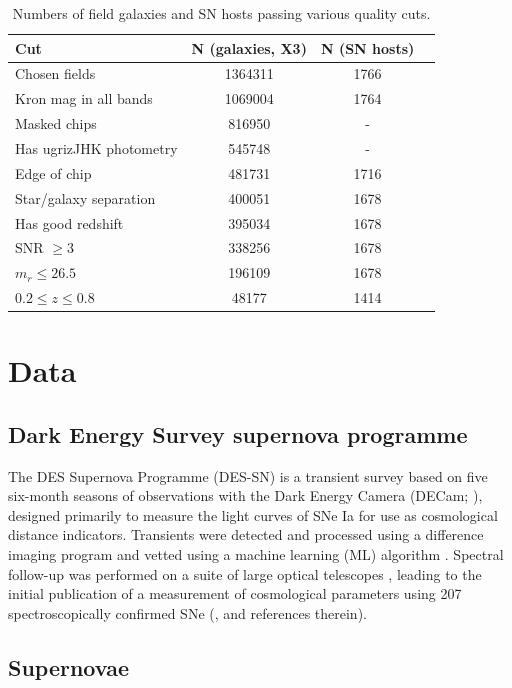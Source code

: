 \documentclass[fleqn,usenatbib]{mnras}
\begin{document}
\begin{table}
	\centering
	\caption{Numbers of field galaxies and SN hosts passing various quality cuts.}
	\label{tab:field_vuts}
	\begin{tabular}{lccr} %
		\hline
		Cut & N (galaxies, X3)  & N (SN hosts)\\
		\hline
		Chosen fields & 1364311  & 1766\\
	    Kron mag in all bands & 1069004  & 1764 \\
	    Masked chips & 816950  & - \\
	    Has ugrizJHK photometry & 545748  & -\\
	    Edge of chip & 481731 & 1716 \\
	    Star/galaxy separation & 400051 &  1678\\
	    Has good redshift & 395034 & 1678 \\
	    SNR $\geq 3$& 338256  & 1678 \\
	    $m_r \leq 26.5$ & 196109 &  1678 \\
	    $0.2 \leq z \leq 0.8$ & 48177 & 1414\\ 
	    
		\hline
	\end{tabular}
\end{table}

\section{Data \label{sec:data}}
\subsection{Dark Energy Survey supernova programme \label{subsec:des}}
The DES Supernova Programme (DES-SN) is a transient survey based on five six-month seasons of observations with the Dark Energy Camera (DECam; \citealt{Flaugher2015}), designed primarily to measure the light curves of SNe Ia for use as cosmological distance indicators. Transients were detected and processed using a difference imaging program \citep{Kessler2015} and vetted using a machine learning (ML) algorithm \citep{Goldstein2015}. Spectral follow-up was performed on a suite of large optical telescopes \citet{Smith2020b}, leading to the initial publication of a measurement of cosmological parameters using 207 spectroscopically confirmed SNe (\citealt{DESCollaboration2018a}, and references therein). 
\subsection{Supernovae \label{subsec:host_sample}}
\end{document}
